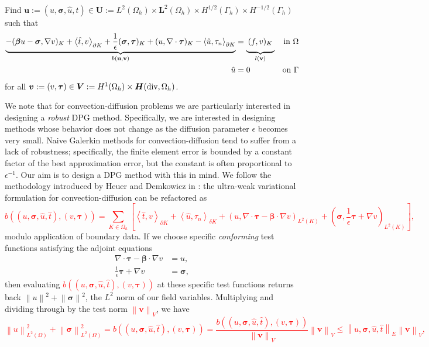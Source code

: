 \documentclass[letterpaper]{article}
\def\btau{\boldsymbol\tau}
\def\bftau{\boldsymbol\tau}
\def\bfsigma{\boldsymbol\sigma}
\def\bbeta{\boldsymbol\beta}
\newcommand{\bs}[1]{\boldsymbol{#1}}
\newcommand{\norm}[1]{\left\| #1 \right\|}
\newcommand{\LRp}[1]{\left( #1 \right)}
\newcommand{\LRs}[1]{\left[ #1 \right]}
\newcommand{\LRa}[1]{\left\langle #1 \right\rangle}
\newcommand{\uh}{\widehat{u}}
\renewcommand{\L}{L^2\LRp{\Omega}}
\newcommand{\Oh}{\Omega_h}
\newcommand{\bfv}{\boldsymbol v}
\newcommand{\bfH}{\mbox{\boldmath $H$}}
\newcommand{\grad}{\nabla}
\renewcommand{\div}{\grad \cdot}
\newcommand{\red}[1]{\textcolor{red}{#1}}
\begin{document}
Find
$\bs u:=(u,\bfsigma,\hat u,\hat t)
\in\bs U:=L^2(\Omega_h)\times \bs L^2(\Omega_h)\times H^{1/2}(\Gamma_h)\times H^{-1/2}(\Gamma_h)$
such that
\begin{align}
\label{eq:variationalFormulation}
\underbrace{-(\bbeta u-\bfsigma,\nabla v)_K+\LRa{\hat t,v}_{\partial K}
+ \frac{1}{\epsilon}(\bfsigma,\btau)_K
+(u,\nabla\cdot\btau)_K
-\LRa{\hat u,\tau_n}_{\partial K}}_{b(\mathbf{u}, \mathbf{v})}
&=\underbrace{\:(f,v)_K\genfrac{}{}{0pt}{}{}{}}_{l(\mathbf{v})} &\text{in }\Omega \\
\hat u&=0 &\text{on }\Gamma
\end{align}
for all $\bs v:=(v,\btau)\in
\bs V:=H^1(\Omega_h)\times\bfH(\text{div},\Omega_h)$.


We note that for convection-diffusion problems we are particularly
interested in designing a \textit{robust} DPG method.  Specifically, we are
interested in designing methods whose behavior does not change as the
diffusion parameter $\epsilon$ becomes very small.  Naive Galerkin methods for
convection-diffusion tend to suffer from a lack of robustness; specifically,
the finite element error is bounded by a constant factor of the best
approximation error, but the constant is often proportional to
$\epsilon^{-1}$.  Our aim is to design a DPG method with this in mind.  We
follow the methodology introduced by Heuer and Demkowicz in
\cite{DemkowiczHeuer}: the ultra-weak variational formulation for
convection-diffusion can be refactored as
\red{
\[
b\LRp{\LRp{u,\bfsigma,\uh,\hat t},\LRp{v,\bftau}} =
\sum_{K\in \Oh}\LRs{\LRa{\hat t,v}_{\partial K}
+\LRa{\uh,\tau_n}_{\delta K} + \LRp{u,\div \bftau
-\bbeta\cdot\grad v}_{L^2(K)}
+\LRp{\bfsigma,\frac{1}{\epsilon} \bftau + \grad v}_{L^2(K)}},
\]
}
modulo application of boundary data.  If we choose specific
\textit{conforming} test functions satisfying the adjoint equations
\begin{align*}
\div \bftau - \bbeta \cdot \grad v &= u,\\
\frac{1}{\epsilon} \bftau + \grad v &= \bfsigma,
\end{align*}
then evaluating \red{$b\LRp{\LRp{u,\bfsigma,\uh,\hat t},\LRp{v,\bftau}}$} at these
specific test functions returns back $\norm{u}^2 + \norm{\bfsigma}^2$, the $L^2$
norm of our field variables.  Multiplying and dividing through by the test
norm \red{$\norm{\bfv}_V$}, we have
\red{
\[
\norm{u}_{\L}^2 + \norm{\bfsigma}_{\L}^2 =
b\LRp{\LRp{u,\bfsigma,\uh,\hat t},\LRp{v,\bftau}} =
\frac{b\LRp{\LRp{u,\bfsigma,\uh,\hat t},\LRp{v,\bftau}}}{\norm{\bfv}_V}\norm{\bfv}_V
\leq \norm{u,\bfsigma,\uh,\hat t}_E\norm{\bfv}_V,
\]
}
\end{document}
